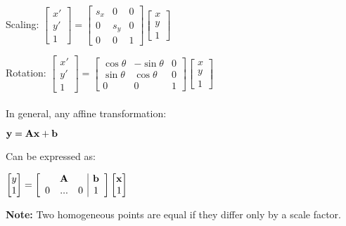 \documentclass{article}
\begin{document}
Scaling: $\begin{bmatrix}x'\\y'\\1\end{bmatrix}
= \begin{bmatrix}s_x&0&0\\0&s_y&0\\0&0&1\end{bmatrix}
\begin{bmatrix}x\\y\\1\end{bmatrix}$

Rotation: $\begin{bmatrix}x'\\y'\\1\end{bmatrix}
=\begin{bmatrix}\cos\theta&-\sin\theta&0\\
		\sin\theta&\cos\theta&0\\
		0&0&1\end{bmatrix}
\begin{bmatrix} x\\y\\1	\end{bmatrix}$\\
\vspace{2.5mm}
\vspace{2.5mm}
\\
In general, any affine transformation:

\centerline{$\bf y = Ax + b$}

Can be expressed as:

\centerline{$ \begin{bmatrix}y\\1\end{bmatrix}=
	 \left[ \begin{array}{ccc|c}
	 &{\bf A}&& {\bf b} \\ 0&...&0&1
	\end{array} \right] 
	\begin{bmatrix}
	{\bf x}\\1
	\end{bmatrix}
$}

{\bf Note:} Two homogeneous points are equal if they differ only by a scale factor.
\end{document}
